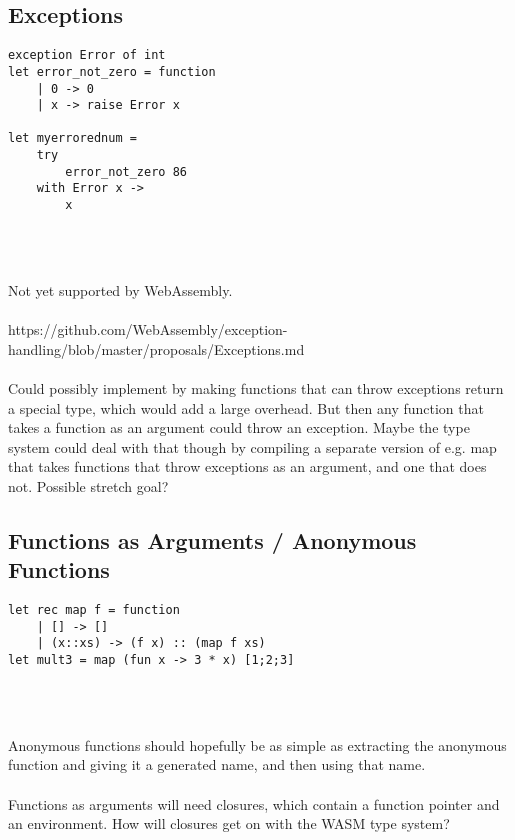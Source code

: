\documentclass{article}
\begin{document}
\subsection{Exceptions}    
\begin{minipage}{0.4\linewidth}
\begin{verbatim}
exception Error of int
let error_not_zero = function
    | 0 -> 0
    | x -> raise Error x
    
let myerrorednum =
    try 
        error_not_zero 86
    with Error x ->
        x
\end{verbatim}
\end{minipage}  
\begin{minipage}{0.6\linewidth}
\begin{verbatim}

\end{verbatim}
\end{minipage}
\\\\
Not yet supported by WebAssembly.
\\\\
https://github.com/WebAssembly/exception-handling/blob/master/proposals/Exceptions.md
\\\\
Could possibly implement by making functions that can throw exceptions return a special type, which would add a large overhead. But then any function that takes a function as an argument could throw an exception. Maybe the type system could deal with that though by compiling a separate version of e.g. map that takes functions that throw exceptions as an argument, and one that does not. Possible stretch goal?

\subsection{Functions as Arguments / Anonymous Functions}
\begin{minipage}{0.4\linewidth}
\begin{verbatim}
let rec map f = function
    | [] -> []
    | (x::xs) -> (f x) :: (map f xs)
let mult3 = map (fun x -> 3 * x) [1;2;3]
\end{verbatim}
\end{minipage}  
\begin{minipage}{0.6\linewidth}
\begin{verbatim}

\end{verbatim}
\end{minipage}
\\\\
Anonymous functions should hopefully be as simple as extracting the anonymous function and giving it a generated name, and then using that name.
\\\\
Functions as arguments will need closures, which contain a function pointer and an environment. How will closures get on with the WASM type system?
\end{document}
